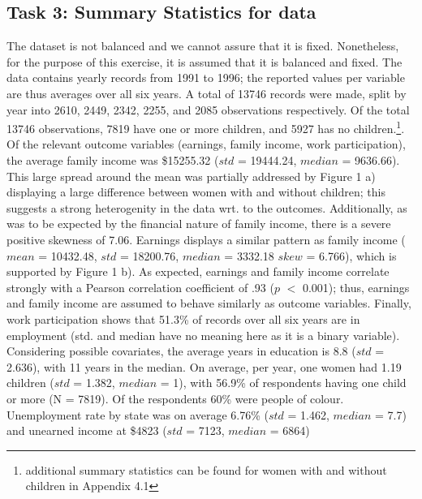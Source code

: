 \documentclass[a4paper]{article}
\begin{document}
\subsection{Task 3: Summary Statistics for data}
The dataset is not balanced and we cannot assure that it is fixed. Nonetheless, for the purpose of this exercise, it is assumed that it is balanced and fixed. The data contains yearly records from 1991 to 1996; the reported values per variable are thus averages over all six years. A total of 13746 records were made, split by year into 2610, 2449, 2342, 2255, and 2085 observations respectively. Of the total 13746 observations, 7819 have one or more children, and 5927 has no children.\footnote{additional summary statistics can be found for women with and without children in Appendix 4.1}. Of the relevant outcome variables (earnings, family income, work participation), the average family income was \$15255.32 ($std$ = 19444.24, $median$ = 9636.66). This large spread around the mean was partially addressed by Figure 1 a) displaying a large difference between women with and without children; this suggests a strong heterogenity in the data wrt. to the outcomes. Additionally, as was to be expected by the financial nature of family income, there is a severe positive skewness of 7.06. Earnings displays a similar pattern as family income ($mean$ = 10432.48, $std$ = 18200.76, $median$ = 3332.18 $skew$ = 6.766), which is supported by Figure 1 b). As expected, earnings and family income correlate strongly with a Pearson correlation coefficient of .93 ($p$ $<$ 0.001); thus, earnings and family income are assumed to behave similarly as outcome variables. Finally, work participation shows that 51.3\% of records over all six years are in employment (std. and median have no meaning here as it is a binary variable). Considering possible covariates, the average years in education is 8.8 ($std$ = 2.636), with 11 years in the median. On average, per year, one women had 1.19 children ($std$ = 1.382, $median$ = 1), with 56.9\% of respondents having one child or more (N = 7819). Of the respondents 60\% were people of colour. Unemployment rate by state was on average 6.76\% ($std$ = 1.462, $median$ = 7.7) and unearned income at \$4823 ($std$ = 7123, $median$ = 6864)
\end{document}

